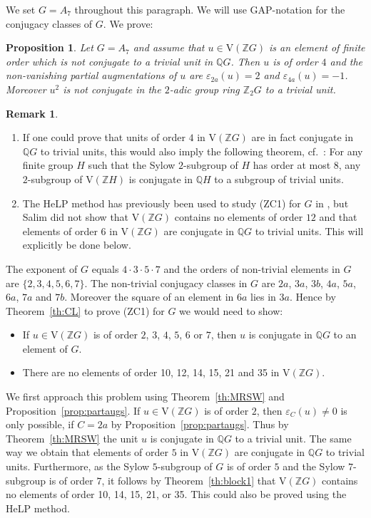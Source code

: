 \documentclass[10pt,a4paper,reqno]{amsart}
\newtheorem{proposition}[theorem]{Proposition}
\theoremstyle{definition}
\newtheorem{remark}[theorem]{Remark}
\theoremstyle{remark}
\newcommand{\V}{\mathrm{V}}
\newcommand{\ZZ}{\mathbb{Z}}
\newcommand{\QQ}{\mathbb{Q}}
\begin{document}
{We set $G= A_7$ throughout this paragraph. We will use \textsf{GAP}-notation for the conjugacy classes of $G$. We prove:

\begin{proposition}\label{prop:A7}
Let $G= A_7$ and assume that $u \in \V(\ZZ G)$ is an element of finite order which is not conjugate to a trivial unit in $\QQ G$. Then $u$ is of order $4$ and the non-vanishing partial augmentations of $u$ are $\varepsilon_{2a}(u) = 2$ and $\varepsilon_{4a}(u) = -1$. Moreover $u^2$ is not conjugate in the $2$-adic group ring $\ZZ_2 G$ to a trivial unit.  
\end{proposition}

\begin{remark}
\begin{enumerate}
\item If one could prove that units of order $4$ in $\V(\ZZ G)$ are in fact conjugate in $\QQ G$ to trivial units, this would also imply the following theorem, cf.\ \cite[Remark on p. 298]{Mar17}: For any finite group $H$ such that the Sylow $2$-subgroup of $H$ has order at most $8$, any $2$-subgroup of $\V(\ZZ H)$ is conjugate in $\QQ H$ to a subgroup of trivial units.
\item The HeLP method has previously been used to study (ZC1) for $G$ in \cite{Sal11}, but Salim did not show that $\V(\ZZ G)$ contains no elements of order $12$ and that elements of order $6$ in $\V(\ZZ G)$ are conjugate in $\QQ G$ to trivial units. This will explicitly be done below.
\end{enumerate}
\end{remark}

The exponent of $G$ equals $4 \cdot 3 \cdot 5 \cdot 7$ and the orders of non-trivial elements in $G$ are $\{2,3,4,5,6,7\}$. The non-trivial conjugacy classes in $G$ are $2a$, $3a$, $3b$, $4a$, $5a$, $6a$, $7a$ and $7b$. Moreover the square of an element in $6a$ lies in $3a$. Hence by Theorem~\ref{th:CL} to prove (ZC1) for $G$ we would need to show:
\begin{itemize}
\item If $u \in \V(\ZZ G)$ is of order $2$, $3$, $4$, $5$, $6$ or $7$, then $u$ is conjugate in $\QQ G$ to an element of $G$.
\item There are no elements of order 10, 12, 14, 15, 21 and 35 in $\V(\ZZ G)$.
\end{itemize}

We first approach this problem using Theorem~\ref{th:MRSW} and Proposition~\ref{prop:partaugs}. If $u \in \V(\ZZ G)$ is of order $2$, then $\varepsilon_C(u) \neq 0$ is only possible, if $C = 2a$ by Proposition~\ref{prop:partaugs}. Thus by Theorem~\ref{th:MRSW} the unit $u$ is conjugate in $\QQ G$ to a trivial unit. The same way we obtain that elements of order $5$ in $\V(\ZZ G)$ are conjugate in $\QQ G$ to trivial units. Furthermore, as the Sylow $5$-subgroup of $G$ is of order $5$ and the Sylow $7$-subgroup is of order $7$, it follows by Theorem~\ref{th:block1} that $\V(\ZZ G)$ contains no elements of order 10, 14, 15, 21, or 35. This could also be proved using the HeLP method.

}
\end{document}

